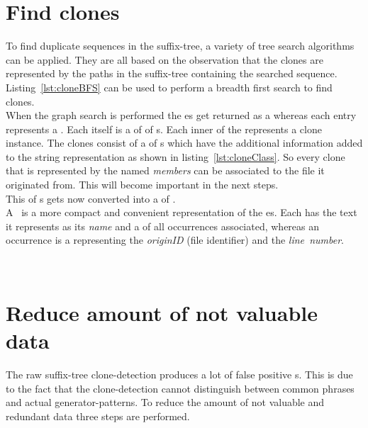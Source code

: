 \section{Find clones}
\label{section:findClones}
To find duplicate sequences in the suffix-tree, a variety of tree search algorithms can be applied. They are all based on the observation that the clones are represented by the paths in the suffix-tree containing the searched sequence. Listing~\ref{lst:cloneBFS} can be used to perform a breadth first search to find clones.\\
When the graph search is performed the es get returned as a  whereas each entry represents a . Each  itself is a  of  of s. Each inner  of the  represents a clone instance. The clones consist of a  of s which have the additional information added to the string representation as shown in listing~\ref{lst:cloneClass}. So every clone that is represented by the  named \textit{members} can be associated to the file it originated from. This will become important in the next steps.\\
This  of s gets now converted into a  of . \\
A~ is a more compact and convenient representation of the es. Each has the text it represents as its \textit{name} and a  of all occurrences associated, whereas an occurrence is a  representing the \textit{originID} (file identifier) and the \textit{line~number}.\\

\cleardoublepage{}
\quad\\


\section{Reduce amount of not valuable data}
\label{section:processCloneResults}
The raw suffix-tree clone-detection produces a lot of false positive s. This is due to the fact that the clone-detection cannot distinguish between common phrases and actual generator-patterns. To reduce the amount of not valuable and redundant data three steps are performed.
